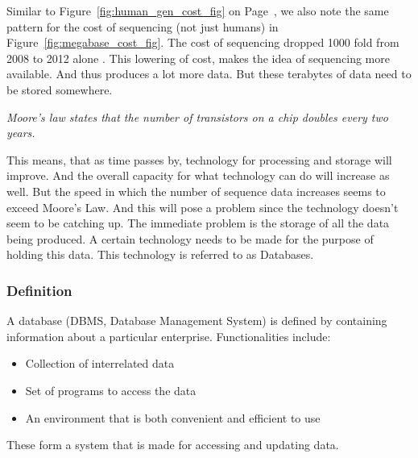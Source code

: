 \documentclass{article}
\begin{document}
Similar to Figure~\ref{fig:human_gen_cost_fig} on Page~\pageref{fig:human_gen_cost_fig}, we also note the same pattern for the cost of sequencing (not just humans) in Figure~\ref{fig:megabase_cost_fig}\autocite{genomics-cost}. The cost of sequencing dropped 1000 fold from 2008 to 2012 alone \autocite{bon_compression}. This lowering of cost, makes the idea of sequencing more available. And thus produces a lot more data. But these terabytes of data need to be stored somewhere. 
 
\begin{center}
\textit{Moore's law states that the number of transistors on a chip doubles every two years.}
\end{center}


This means, that as time passes by, technology for processing and storage will improve. And the overall capacity for what technology can do will increase as well. But the speed in which the number of sequence data increases seems to exceed Moore's Law. And this will pose a problem since the technology doesn't seem to be catching up. The immediate problem is the storage of all the data being produced. A certain technology needs to be made for the purpose of holding this data. This technology is referred to as Databases. 


\subsubsection{Definition}
A database (DBMS, Database Management System) is defined by containing information about a particular enterprise. Functionalities include: \autocite{Silberschatz2010}
\begin{itemize}
    \item Collection of interrelated data
    \item Set of programs to access the data
    \item An environment that is both convenient and efficient to use
\end{itemize}

These form a system that is made for accessing and updating data. 
\end{document}
